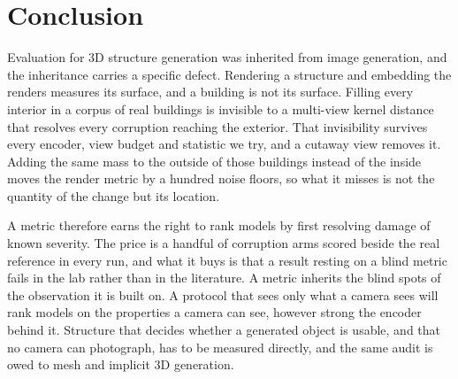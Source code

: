 \section{Conclusion}

Evaluation for {3D} structure generation was inherited from image generation, and the
inheritance carries a specific defect. Rendering a structure and embedding the renders
measures its surface, and a building is not its surface. Filling every interior in a corpus
of real buildings is invisible to a multi-view kernel distance that resolves every
corruption reaching the exterior. That invisibility survives every encoder, view
budget and statistic we try, and a cutaway view removes it. Adding the same mass to the
outside of those buildings instead of the inside moves the render metric by a hundred noise
floors, so what it misses is not the quantity of the change but its location.

A metric therefore earns the right to rank models by first resolving damage of known
severity. The price is a handful of corruption arms scored beside the real reference in
every run, and what it buys is that a result resting on a blind metric fails in the lab
rather than in the literature. A metric inherits the blind spots of the observation it is
built on. A protocol that sees only what a camera sees will rank
models on the properties a camera can see, however strong the encoder behind it. Structure
that decides whether a generated object is usable, and that no camera can photograph, has
to be measured directly, and the same audit is owed to mesh and implicit {3D}
generation. \label{endofmain}
